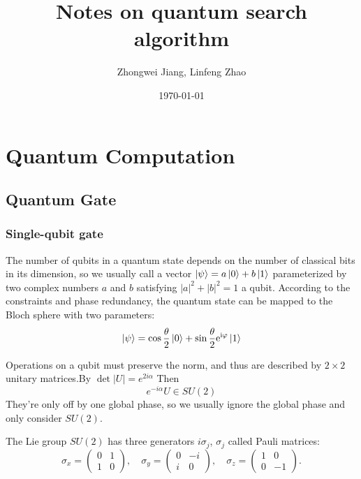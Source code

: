 \documentclass[a4paper,10pt]{article}
\title{Notes on quantum search algorithm}
\author{Zhongwei Jiang, Linfeng Zhao}
\date{\today}
\numberwithin{equation}{subsection}
\begin{document}
\maketitle

\section{Quantum Computation}

\subsection{Quantum Gate}

\subsubsection{Single-qubit gate}

The number of qubits in a quantum state depends on the number of classical bits in its dimension, so we usually call a vector $\ket{\psi} = a\ket{0} + b\ket{1}$ parameterized by two complex numbers $a$ and $b$ satisfying $|a|^2 + |b|^2 = 1$ a qubit. According to the constraints and phase redundancy, the quantum state can be mapped to the Bloch sphere with two parameters:
\begin{equation}
    \ket{\psi} = \cos \frac{\theta}{2}\ket{0} + \sin \frac{\theta}{2}\mathrm{e}^{\mathrm{i}\varphi }\ket{1}
\end{equation}

Operations on a qubit must preserve the norm, and thus are described by $2\times2$ unitary matrices.By $\det|U|=e^{2i\alpha}$ Then
\begin{equation}
    e^{-i\alpha}U\in SU(2)
\end{equation}
They're only off by one global phase, so we usually ignore the global phase and only consider $SU(2)$.

The Lie group $SU(2)$ has three generators $i\sigma_j$, $\sigma_j$ called Pauli matrices:
\begin{equation}
    \sigma_x = \begin{pmatrix} 0 & 1 \\ 1 & 0 \end{pmatrix}, \quad
    \sigma_y = \begin{pmatrix} 0 & -i \\ i & 0 \end{pmatrix}, \quad
    \sigma_z = \begin{pmatrix} 1 & 0 \\ 0 & -1 \end{pmatrix}.
\end{equation}
\end{document}
